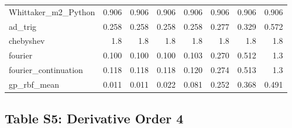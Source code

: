 \begin{longtable}{lrrrrrrr}
Whittaker\_m2\_Python & 0.906 & 0.906 & 0.906 & 0.906 & 0.906 & 0.906 & 0.906 \\
ad\_trig & 0.258 & 0.258 & 0.258 & 0.258 & 0.277 & 0.329 & 0.572 \\
chebyshev & 1.8 & 1.8 & 1.8 & 1.8 & 1.8 & 1.8 & 1.8 \\
fourier & 0.100 & 0.100 & 0.100 & 0.103 & 0.270 & 0.512 & 1.3 \\
fourier\_continuation & 0.118 & 0.118 & 0.118 & 0.120 & 0.274 & 0.513 & 1.3 \\
gp\_rbf\_mean & 0.011 & 0.011 & 0.022 & 0.081 & 0.252 & 0.368 & 0.491 \\
\bottomrule
\end{longtable}

\clearpage

\subsection*{Table S5: Derivative Order 4}

